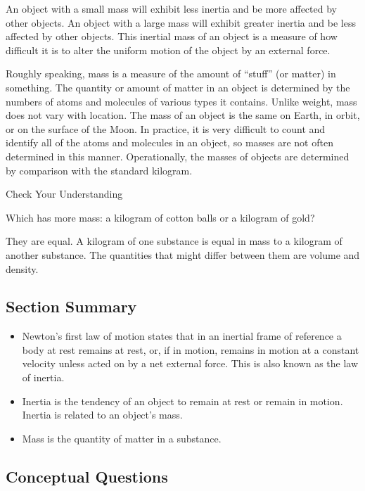\documentclass[
]{book}
\providecommand{\tightlist}{%
  \setlength{\itemsep}{0pt}\setlength{\parskip}{0pt}}
\begin{document}
An object with a small mass will exhibit less inertia and be more
affected by other objects. An object with a large mass will exhibit
greater inertia and be less affected by other objects. This inertial
mass of an object is a measure of how difficult it is to alter the
uniform motion of the object by an external force.

Roughly speaking, mass is a measure of the amount of ``stuff'' (or matter)
in something. The quantity or amount of matter in an object is
determined by the numbers of atoms and molecules of various types it
contains. Unlike weight, mass does not vary with location. The mass of
an object is the same on Earth, in orbit, or on the surface of the Moon.
In practice, it is very difficult to count and identify all of the atoms
and molecules in an object, so masses are not often determined in this
manner. Operationally, the masses of objects are determined by
comparison with the standard kilogram.

\hypertarget{fs-id2448968}{}
Check Your Understanding

\leavevmode{}%
Which has more mass: a kilogram of cotton balls or a kilogram of gold?

\leavevmode{}%
They are equal. A kilogram of one substance is equal in mass to a
kilogram of another substance. The quantities that might differ between
them are volume and density.

\hypertarget{fs-id1651376-summary}{}
\hypertarget{section-summary-9}{%
\subsection{Section Summary}\label{section-summary-9}}

\begin{itemize}
\tightlist
\item
  {Newton's first law of motion} states that in an
  inertial frame of reference a body at rest remains at rest, or, if
  in motion, remains in motion at a constant velocity unless acted on
  by a net external force. This is also known as the {law of
  inertia}.
\item
  {Inertia}\textbf{} is the
  tendency of an object to remain at rest or remain in motion. Inertia
  is related to an object's mass.
\item
  {Mass} is the quantity of matter in a substance.
\end{itemize}

\hypertarget{fs-id2668844}{}
\hypertarget{conceptual-questions-12}{%
\subsection{Conceptual Questions}\label{conceptual-questions-12}}
\end{document}
